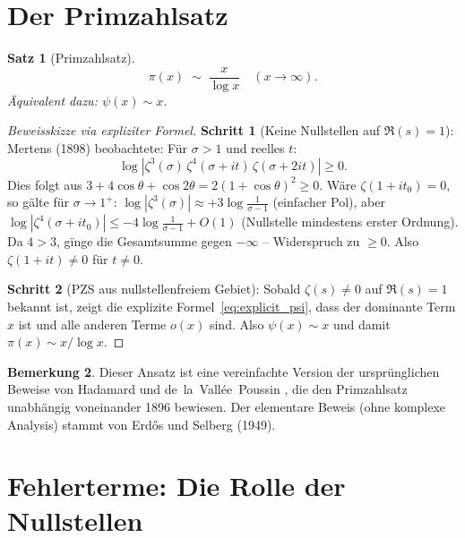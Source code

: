 \documentclass[12pt,a4paper]{amsart}
\newtheorem{theorem}{Satz}[section]
\theoremstyle{definition}
\newtheorem{remark}[theorem]{Bemerkung}
\begin{document}
\section{Der Primzahlsatz}

\begin{theorem}[Primzahlsatz]
\label{thm:pnt}
\[
  \pi(x) \;\sim\; \frac{x}{\log x} \quad (x \to \infty).
\]
\"Aquivalent dazu: $\psi(x) \sim x$.
\end{theorem}

\begin{proof}[Beweisskizze via expliziter Formel]
\textbf{Schritt 1} (Keine Nullstellen auf $\Re(s) = 1$):
Mertens (1898) beobachtete: F\"ur $\sigma > 1$ und reelles $t$:
\[
  \log|\zeta^3(\sigma)\,\zeta^4(\sigma+it)\,\zeta(\sigma+2it)| \ge 0.
\]
Dies folgt aus $3 + 4\cos\theta + \cos 2\theta = 2(1+\cos\theta)^2 \ge 0$.
W\"are $\zeta(1+it_0) = 0$, so g\"alte f\"ur $\sigma \to 1^+$:
$\log|\zeta^3(\sigma)| \approx +3\log\tfrac{1}{\sigma-1}$ (einfacher Pol),
aber $\log|\zeta^4(\sigma+it_0)| \le -4\log\tfrac{1}{\sigma-1} + O(1)$
(Nullstelle mindestens erster Ordnung).
Da $4 > 3$, g\"inge die Gesamtsumme gegen $-\infty$ -- Widerspruch zu $\ge 0$.
Also $\zeta(1+it) \ne 0$ f\"ur $t \ne 0$.

\textbf{Schritt 2} (PZS aus nullstellenfreiem Gebiet):
Sobald $\zeta(s) \ne 0$ auf $\Re(s) = 1$ bekannt ist, zeigt die explizite
Formel~\eqref{eq:explicit_psi}, dass der dominante Term $x$ ist
und alle anderen Terme $o(x)$ sind.
Also $\psi(x) \sim x$ und damit $\pi(x) \sim x/\log x$.
\end{proof}

\begin{remark}
Dieser Ansatz ist eine vereinfachte Version der urspr\"unglichen Beweise
von Hadamard \cite{Hadamard1896} und de~la~Vall\'ee~Poussin \cite{Poussin1896},
die den Primzahlsatz unabh\"angig voneinander 1896 bewiesen.
Der elementare Beweis (ohne komplexe Analysis) stammt von
Erd\H{o}s und Selberg (1949).
\end{remark}

\section{Fehlerterme: Die Rolle der Nullstellen}
\end{document}
